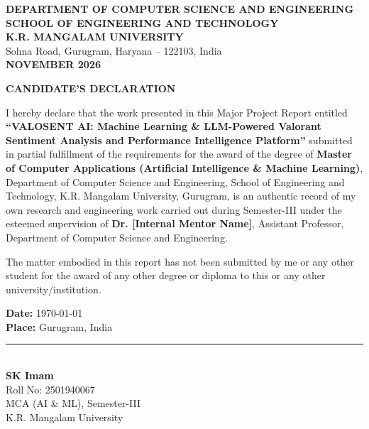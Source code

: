 \begin{titlepage}
\begin{center}
    \vfill
    {\large \textbf{\color{krmunavy}DEPARTMENT OF COMPUTER SCIENCE AND ENGINEERING}}\\[0.15cm]
    {\large \textbf{SCHOOL OF ENGINEERING AND TECHNOLOGY}}\\[0.15cm]
    {\Large \textbf{K.R. MANGALAM UNIVERSITY}}\\[0.15cm]
    {\normalsize Sohna Road, Gurugram, Haryana -- 122103, India}\\[0.3cm]
    {\large \textbf{NOVEMBER 2026}}
\end{center}
\end{titlepage}

\newpage
\thispagestyle{plain}
\begin{center}
    {\Large \bfseries \color{krmunavy} CANDIDATE'S DECLARATION}\\[1.0cm]
\end{center}

\noindent I hereby declare that the work presented in this Major Project Report entitled \textbf{``VALOSENT AI: Machine Learning \& LLM-Powered Valorant Sentiment Analysis and Performance Intelligence Platform''} submitted in partial fulfillment of the requirements for the award of the degree of \textbf{Master of Computer Applications (Artificial Intelligence \& Machine Learning)}, Department of Computer Science and Engineering, School of Engineering and Technology, K.R. Mangalam University, Gurugram, is an authentic record of my own research and engineering work carried out during Semester-III under the esteemed supervision of \textbf{Dr. [Internal Mentor Name]}, Assistant Professor, Department of Computer Science and Engineering.

\vspace{0.8cm}
\noindent The matter embodied in this report has not been submitted by me or any other student for the award of any other degree or diploma to this or any other university/institution.

\vspace{2.5cm}
\noindent
\begin{minipage}[t]{0.5\textwidth}
    \textbf{Date:} \today\\[0.2cm]
    \textbf{Place:} Gurugram, India
\end{minipage}
\begin{minipage}[t]{0.48\textwidth}
    \begin{flushright}
        \vspace{-0.5cm}
        \rule{6cm}{0.6pt}\\[0.2cm]
        \textbf{SK Imam}\\
        Roll No: 2501940067\\
        MCA (AI \& ML), Semester-III\\
        K.R. Mangalam University
    \end{flushright}
\end{minipage}

